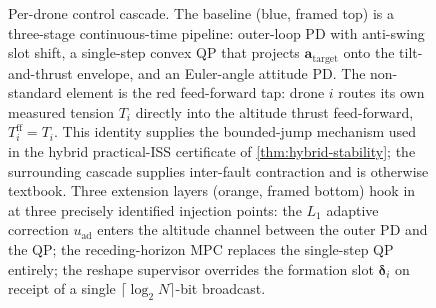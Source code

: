 \begin{figure}[t]
\caption{Per-drone control cascade. The baseline (blue, framed top) is
a three-stage continuous-time pipeline: outer-loop PD with anti-swing
slot shift, a single-step convex QP that projects
$\mathbf{a}_{\mathrm{target}}$ onto the tilt-and-thrust envelope, and an
Euler-angle attitude PD. The non-standard element is the red
feed-forward tap: drone $i$ routes its own measured tension $T_i$
directly into the altitude thrust feed-forward,
$T_i^{\mathrm{ff}} = T_i$. This identity supplies the bounded-jump
mechanism used in the hybrid practical-ISS certificate of
\cref{thm:hybrid-stability}; the surrounding cascade supplies
inter-fault contraction and is otherwise
textbook. Three extension layers (orange, framed bottom) hook in at
three precisely identified injection points: the $L_1$ adaptive
correction $u_{\mathrm{ad}}$ enters the altitude channel between the
outer PD and the QP; the receding-horizon MPC replaces the single-step
QP entirely; the reshape supervisor overrides the formation slot
$\boldsymbol{\delta}_i$ on receipt of a single
$\lceil\log_2 N\rceil$-bit broadcast.}
\label{fig:controller-cascade}
\end{figure}
